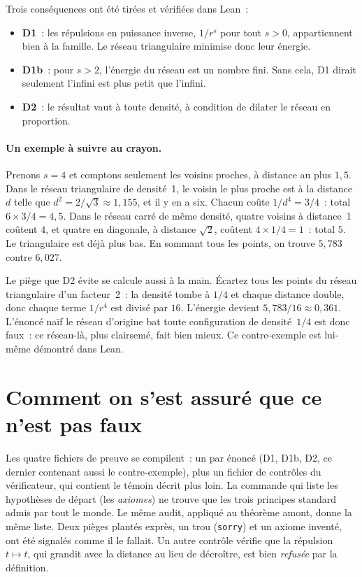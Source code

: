 Trois conséquences ont été tirées et vérifiées dans Lean~:
\begin{itemize}
\item \textbf{D1}~: les répulsions en puissance inverse, $1/r^s$ pour tout $s>0$, appartiennent bien à la famille.
  Le réseau triangulaire minimise donc leur énergie.
\item \textbf{D1b}~: pour $s>2$, l'énergie du réseau est un nombre fini. Sans cela, D1 dirait seulement
  \og l'infini est plus petit que l'infini\fg.
\item \textbf{D2}~: le résultat vaut à toute densité, à condition de dilater le réseau en proportion.
\end{itemize}

\paragraph{Un exemple à suivre au crayon.} Prenons $s=4$ et comptons seulement les voisins proches, à distance
au plus $1{,}5$. Dans le réseau triangulaire de densité~1, le voisin le plus proche est à la distance $d$ telle que
$d^2=2/\sqrt3\approx1{,}155$, et il y en a six. Chacun coûte $1/d^4=3/4$~: total $6\times3/4=4{,}5$. Dans le réseau
carré de même densité, quatre voisins à distance~1 coûtent $4$, et quatre en diagonale, à distance $\sqrt2$,
coûtent $4\times1/4=1$~: total $5$. Le triangulaire est déjà plus bas. En sommant tous les points, on trouve
$5{,}783$ contre $6{,}027$.

Le piège que D2 évite se calcule aussi à la main. Écartez tous les points du réseau triangulaire d'un facteur~2~:
la densité tombe à $1/4$ et chaque distance double, donc chaque terme $1/r^4$ est divisé par $16$. L'énergie devient
$5{,}783/16\approx0{,}361$. L'énoncé naïf \og le réseau d'origine bat toute configuration de densité~$1/4$\fg{} est
donc faux~: ce réseau-là, plus clairsemé, fait bien mieux. Ce contre-exemple est lui-même démontré dans Lean.

\section*{Comment on s'est assuré que ce n'est pas faux}

Les quatre fichiers de preuve se compilent~: un par énoncé (D1, D1b, D2, ce dernier contenant aussi le
contre-exemple), plus un fichier de contrôles du vérificateur, qui contient le témoin décrit plus loin. La commande qui liste les hypothèses de départ (les
\emph{axiomes}) ne trouve que les trois principes standard admis par tout le monde. Le même audit, appliqué au
théorème amont, donne la même liste. Deux pièges plantés exprès, un trou (\texttt{sorry}) et un axiome inventé, ont
été signalés comme il le fallait. Un autre contrôle vérifie que la répulsion $t\mapsto t$, qui grandit avec la
distance au lieu de décroître, est bien \emph{refusée} par la définition.

